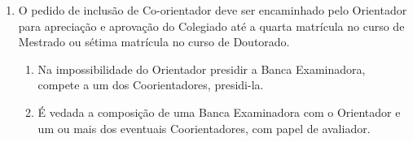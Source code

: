 \documentclass{article}
\newcommand{\grupoMenor}{Colegiado\xspace}
\begin{document}
\begin{enumerate}
	\item O pedido de inclusão de Co-orientador deve ser encaminhado pelo Orientador para apreciação e aprovação do \grupoMenor até a quarta matrícula no curso de Mestrado ou sétima matrícula no curso de Doutorado.
	\begin{enumerate}
		\item Na impossibilidade do Orientador presidir a Banca Examinadora, compete a um dos Coorientadores, presidi-la.
		\item É vedada a composição de uma Banca Examinadora com o Orientador e um ou mais dos eventuais Coorientadores, com papel de avaliador.
	\end{enumerate}

\end{enumerate}
\end{document}
